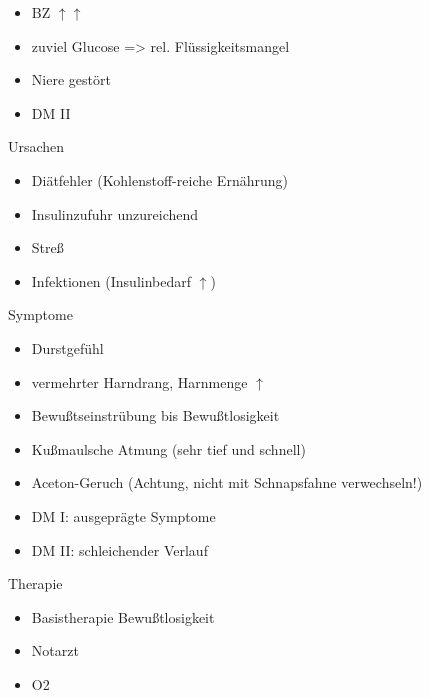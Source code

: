 \documentclass{article}
\begin{document}
\begin{itemize}
\item BZ ${\uparrow}$${\uparrow}$

\item zuviel Glucose ={\textgreater} rel. Fl\"ussigkeitsmangel

\item Niere gest\"ort

\item DM II

\end{itemize}
Ursachen

\begin{itemize}
\item Di\"atfehler (Kohlenstoff-reiche Ern\"ahrung)

\item Insulinzufuhr unzureichend

\item Stre{\ss}

\item Infektionen (Insulinbedarf ${\uparrow}$)

\end{itemize}
Symptome

\begin{itemize}
\item Durstgef\"uhl

\item vermehrter Harndrang, Harnmenge ${\uparrow}$

\item Bewu{\ss}tseinstr\"ubung bis Bewu{\ss}tlosigkeit

\item Ku{\ss}maul{\textquotesingle}sche Atmung (sehr tief und schnell)

\item Aceton-Geruch (Achtung, nicht mit Schnapsfahne verwechseln!)

\item DM I: ausgepr\"agte Symptome

\item DM II: schleichender Verlauf

\end{itemize}
Therapie

\begin{itemize}
\item Basistherapie Bewu{\ss}tlosigkeit

\item Notarzt

\item O2

\end{itemize}
\end{document}
